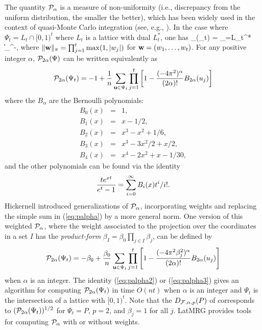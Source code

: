 The quantity ${\cal P}_\alpha$ is a measure of non-uniformity 
(i.e., discrepancy from the uniform distribution, the smaller the better),
which has been widely used in the context of quasi-Monte Carlo integration
(see, e.g., \cite{vSLO94a}).
In the case where $\Psi_t = L_t \cap [0,1)^t$ where $L_t$ is a lattice
with dual $L_t^*$, one has
\eq
 \cP_\alpha(\Psi_t) =
   \sum_{\bzero\not=\bw\in L_t^*} \|\bw\|_{\pi}^{-\alpha},
                                                  \label{eq:palpha}
\endeq
where $\|{\bf w}\|_{\pi}=\prod_{j=1}^t \max(1,|w_j|)$ for ${\bf w} = (w_1,\dots,w_t)$.
For any positive integer $\alpha$, ${\cal P}_{2\alpha}(\Psi)$ can be
written equivalently as
\begin{eqnarray}
 {\cal P}_{2\alpha}(\Psi_t)
  = -1 + \frac{1}{n}\sum_{{\bf u}\in \Psi_t}
    \prod_{j=1}^t \left[1 - \frac{(-4\pi^2)^{\alpha}}{(2\alpha) !}
    B_{2\alpha}(u_j)\right]                      \label{eq:palpha2}
\end{eqnarray}
where the $B_\alpha$ are the Bernoulli polynomials:
\begin {eqnarray*}
 B_0(x) &=& 1,\\
 B_1(x) &=& x -1/2,\\
 B_2(x) &=& x^3 - x^2 + 1/6,\\
 B_3(x) &=& x^3 - 3x^2/2 + x/2,\\
 B_4(x) &=& x^4 - 2x^2 + x - 1/30,
\end {eqnarray*}
and the other polynomials can be found via the identity
$$
  {t e^{xt} \over e^t-1} = \sum_{i=0}^\infty B_i(x) t^i/i!.
$$
Hickernell \cite{vHIC98c} introduced generalizations of ${\cal P}_\alpha$,
incorporating weights and replacing the simple sum in (\ref{eq:palpha})
by a more general norm.  One version of this weighted ${\cal P}_\alpha$,
where the weight associated to the projection over the coordinates
in a set $I$ has the {\em product-form\/}
$\beta_I = \beta_0\prod_{j\in I}\beta_j$, can be defined by
\[
  {\cal P}_{2\alpha} (\Psi_t)
  = -\beta_0 + \frac{\beta_0}{n} \sum_{{\bf u}\in \Psi_t}
    \prod_{j=1}^t \left[1 - \frac{(-4\pi^2\beta_j^2)^{\alpha}}{(2\alpha)!}
    B_{2\alpha}(u_j)\right]                       \label{eq:palpha3}
\]
when $\alpha$ is an integer.  The identity (\ref{eq:palpha2})
or (\ref{eq:palpha3}) gives an algorithm for computing
${\cal P}_{2\alpha}(\Psi_t)$ in time $O(nt)$ when $\alpha$ is an integer
and $\Psi_t$ is the intersection of a lattice with $[0,1)^t$.
Note that the $D_{{\cal F},\alpha,p}(P)$ of \cite{vHIC00b} corresponds to
$({\cal P}_{2\alpha}(\Psi_t))^{1/2}$ for $\Psi_t=P$, 
$p=2$, and $\beta_j=1$ for all $j$.
LatMRG provides tools for computing ${\cal P}_\alpha$ with or without weights.

